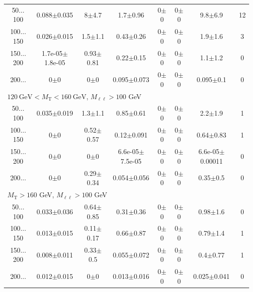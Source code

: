 \begin{landscape}
\begin{table}
\begin{center}
\begin{tabular}{| c | c c c c c c   c | }
50$\dots$100&0.088$\pm$0.035&8$\pm$4.7&1.7$\pm$0.96&0$\pm$0&0$\pm$0&9.8$\pm$6.9&12\\
100$\dots$150&0.026$\pm$0.015&1.5$\pm$1.1&0.43$\pm$0.26&0$\pm$0&0$\pm$0&1.9$\pm$1.6&3\\
150$\dots$200&1.7e-05$\pm$1.8e-05&0.93$\pm$0.81&0.22$\pm$0.15&0$\pm$0&0$\pm$0&1.1$\pm$1.2&0\\
200$\dots$&0$\pm$0&0$\pm$0&0.095$\pm$0.073&0$\pm$0&0$\pm$0&0.095$\pm$0.1&0\\
\hline\hline
\multicolumn{8}{l}{$120~\mathrm{GeV} < M_{\text{T}} < 160~\mathrm{GeV}$, $M_{\ell\ell} > 100$ GeV}\\\hline\hline
50$\dots$100&0.035$\pm$0.019&1.3$\pm$1.1&0.85$\pm$0.61&0$\pm$0&0$\pm$0&2.2$\pm$1.9&1\\
100$\dots$150&0$\pm$0&0.52$\pm$0.57&0.12$\pm$0.091&0$\pm$0&0$\pm$0&0.64$\pm$0.83&1\\
150$\dots$200&0$\pm$0&0$\pm$0&6.6e-05$\pm$7.5e-05&0$\pm$0&0$\pm$0&6.6e-05$\pm$0.00011&0\\
200$\dots$&0$\pm$0&0.29$\pm$0.34&0.054$\pm$0.056&0$\pm$0&0$\pm$0&0.35$\pm$0.5&0\\
\hline\hline
\multicolumn{8}{l}{$M_{\text{T}} > 160$ GeV, $M_{\ell\ell} > 100$ GeV}\\\hline\hline
50$\dots$100&0.033$\pm$0.036&0.64$\pm$0.85&0.31$\pm$0.36&0$\pm$0&0$\pm$0&0.98$\pm$1.6&0\\
100$\dots$150&0.013$\pm$0.015&0.11$\pm$0.17&0.66$\pm$0.87&0$\pm$0&0$\pm$0&0.79$\pm$1.4&1\\
150$\dots$200&0.008$\pm$0.011&0.33$\pm$0.5&0.055$\pm$0.072&0$\pm$0&0$\pm$0&0.4$\pm$0.77&1\\
200$\dots$&0.012$\pm$0.015&0$\pm$0&0.013$\pm$0.016&0$\pm$0&0$\pm$0&0.025$\pm$0.041&0\\
\hline\hline
\end{tabular}
\end{center}
\end{table}
\end{landscape}
